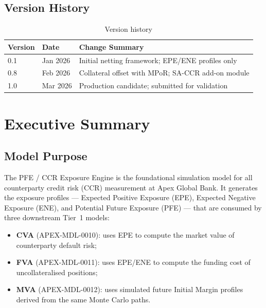 \documentclass[11pt,a4paper]{article}
\begin{document}
\subsection{Version History}

\begin{table}[h!]
\centering
\begin{tabular}{@{}lll@{}}
\toprule
\textbf{Version} & \textbf{Date} & \textbf{Change Summary} \\
\midrule
0.1 & Jan 2026 & Initial netting framework; EPE/ENE profiles only \\
0.8 & Feb 2026 & Collateral offset with MPoR; SA-CCR add-on module \\
1.0 & Mar 2026 & Production candidate; submitted for validation \\
\bottomrule
\end{tabular}
\caption{Version history}
\end{table}

\section{Executive Summary}

\subsection{Model Purpose}

The PFE / CCR Exposure Engine is the foundational simulation model for all
counterparty credit risk (CCR) measurement at Apex Global Bank. It generates
the exposure profiles --- Expected Positive Exposure (EPE), Expected Negative
Exposure (ENE), and Potential Future Exposure (PFE) --- that are consumed by
three downstream Tier~1 models:

\begin{itemize}[noitemsep]
  \item \textbf{CVA} (APEX-MDL-0010): uses EPE to compute the market value of
        counterparty default risk;
  \item \textbf{FVA} (APEX-MDL-0011): uses EPE/ENE to compute the funding cost
        of uncollateralised positions;
  \item \textbf{MVA} (APEX-MDL-0012): uses simulated future Initial Margin
        profiles derived from the same Monte Carlo paths.
\end{itemize}
\end{document}
